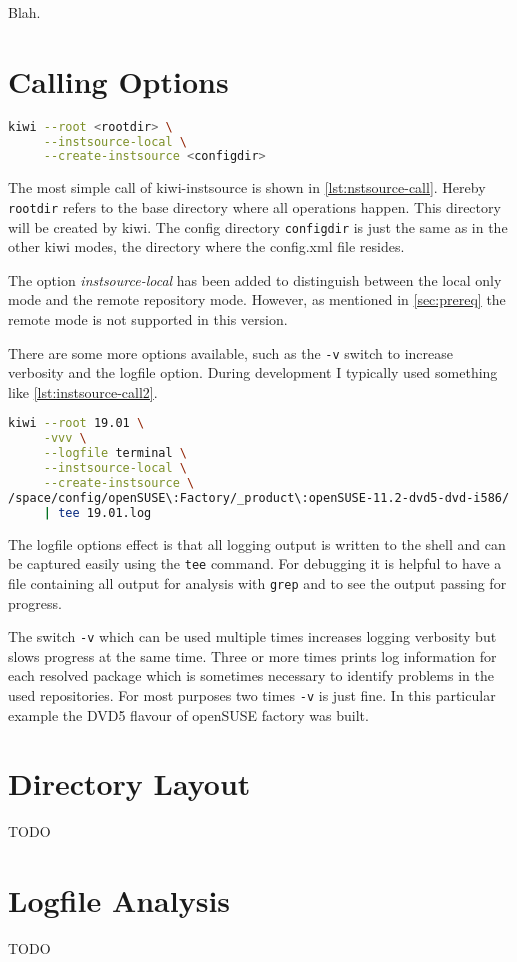Blah.


\section{Calling Options}

\begin{lstlisting}[language=Bash, caption={Calling kiwi-isntsource},
label={lst:nstsource-call}]
kiwi --root <rootdir> \
     --instsource-local \
     --create-instsource <configdir>
\end{lstlisting}

The most simple call of kiwi-inst\-source is shown in \vref{lst:nstsource-call}.
Hereby \texttt{root\-dir} refers to the base directory where all operations
happen. This directory will be created by kiwi. The config directory
\texttt{con\-fig\-dir} is just the same as in the other kiwi modes, the directory
where the config.xml file resides.

The option \textit{instsource-local}  has been added to distinguish between the
local only mode and the remote repository mode. However, as mentioned in
\vref{sec:prereq} the remote mode is not supported in this version.

There are some more options available, such as the \texttt{-v} switch to
increase verbosity and the logfile option. %
During development I typically used something like \vref{lst:instsource-call2}.

\begin{lstlisting}[language=Bash, caption={Typical kiwi-isntsource call during
development},
label={lst:nstsource-call}]
kiwi --root 19.01 \
     -vvv \
     --logfile terminal \
     --instsource-local \
     --create-instsource \
/space/config/openSUSE\:Factory/_product\:openSUSE-11.2-dvd5-dvd-i586/ \
     | tee 19.01.log
\end{lstlisting}

The logfile options effect is that all logging output is written to the shell
and can be captured easily using the \texttt{tee} command. For debugging it is
helpful to have a file containing all output for analysis with \texttt{grep} and
to see the output passing for progress.

The switch \texttt{-v} which can be used multiple times increases logging
verbosity but slows progress at the same time. Three or more times prints log
information for each resolved package which is sometimes necessary to identify
problems in the used repositories. For most purposes two times \texttt{-v} is
just fine. In this particular example the DVD5 flavour of openSUSE factory was
built.


\section{Directory Layout}

TODO


\section{Logfile Analysis}

TODO






